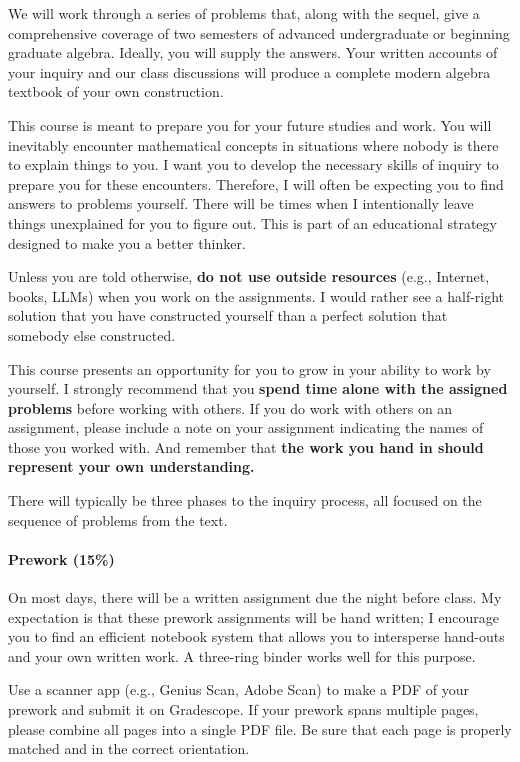 \documentclass[
  twoside]{article}
\begin{document}
We will work through a series of problems that, along with the sequel,
give a comprehensive coverage of two semesters of advanced undergraduate
or beginning graduate algebra. Ideally, you will supply the answers.
Your written accounts of your inquiry and our class discussions will
produce a complete modern algebra textbook of your own construction.

This course is meant to prepare you for your future studies and work.
You will inevitably encounter mathematical concepts in situations where
nobody is there to explain things to you. I want you to develop the
necessary skills of inquiry to prepare you for these encounters.
Therefore, I will often be expecting you to find answers to problems
yourself. There will be times when I intentionally leave things
unexplained for you to figure out. This is part of an educational
strategy designed to make you a better thinker.

Unless you are told otherwise, \textbf{do not use outside resources}
(e.g., Internet, books, LLMs) when you work on the assignments. I would
rather see a half-right solution that you have constructed yourself than
a perfect solution that somebody else constructed.

This course presents an opportunity for you to grow in your ability to
work by yourself. I strongly recommend that you
\textbf{spend time alone with the assigned problems} before working with
others. If you do work with others on an assignment, please include a
note on your assignment indicating the names of those you worked with.
And remember that
\textbf{the work you hand in should represent your own understanding.}

There will typically be three phases to the inquiry process, all focused
on the sequence of problems from the text.

\paragraph{Prework (15\%)}\label{prework-15}

On most days, there will be a written assignment due the night before
class. My expectation is that these prework assignments will be hand
written; I encourage you to find an efficient notebook system that
allows you to intersperse hand-outs and your own written work. A
three-ring binder works well for this purpose.

Use a scanner app (e.g., Genius Scan, Adobe Scan) to make a PDF of your
prework and submit it on Gradescope. If your prework spans multiple
pages, please combine all pages into a single PDF file. Be sure that
each page is properly matched and in the correct orientation.
\end{document}
